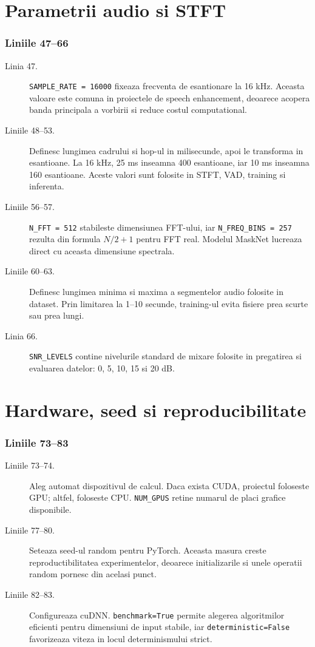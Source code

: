 \documentclass[12pt,a4paper]{report}
\newcommand{\codechunk}[2]{%
\subsection*{Liniile #1--#2}

}
\begin{document}
\chapter{Parametrii audio si STFT}

\codechunk{47}{66}

\begin{description}
    \item[Linia 47.] \texttt{SAMPLE\_RATE = 16000} fixeaza frecventa de esantionare
    la 16 kHz. Aceasta valoare este comuna in proiectele de speech enhancement,
    deoarece acopera banda principala a vorbirii si reduce costul computational.

    \item[Liniile 48--53.] Definesc lungimea cadrului si hop-ul in milisecunde,
    apoi le transforma in esantioane. La 16 kHz, 25 ms inseamna 400 esantioane,
    iar 10 ms inseamna 160 esantioane. Aceste valori sunt folosite in STFT, VAD,
    training si inferenta.

    \item[Liniile 56--57.] \texttt{N\_FFT = 512} stabileste dimensiunea FFT-ului,
    iar \texttt{N\_FREQ\_BINS = 257} rezulta din formula \(N/2 + 1\) pentru
    FFT real. Modelul MaskNet lucreaza direct cu aceasta dimensiune spectrala.

    \item[Liniile 60--63.] Definesc lungimea minima si maxima a segmentelor audio
    folosite in dataset. Prin limitarea la 1--10 secunde, training-ul evita fisiere
    prea scurte sau prea lungi.

    \item[Linia 66.] \texttt{SNR\_LEVELS} contine nivelurile standard de mixare
    folosite in pregatirea si evaluarea datelor: 0, 5, 10, 15 si 20 dB.
\end{description}

\chapter{Hardware, seed si reproducibilitate}

\codechunk{73}{83}

\begin{description}
    \item[Liniile 73--74.] Aleg automat dispozitivul de calcul. Daca exista CUDA,
    proiectul foloseste GPU; altfel, foloseste CPU. \texttt{NUM\_GPUS} retine
    numarul de placi grafice disponibile.

    \item[Liniile 77--80.] Seteaza seed-ul random pentru PyTorch. Aceasta masura
    creste reproductibilitatea experimentelor, deoarece initializarile si unele
    operatii random pornesc din acelasi punct.

    \item[Liniile 82--83.] Configureaza cuDNN. \texttt{benchmark=True} permite
    alegerea algoritmilor eficienti pentru dimensiuni de input stabile, iar
    \texttt{deterministic=False} favorizeaza viteza in locul determinismului strict.
\end{description}
\end{document}
